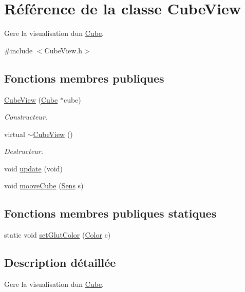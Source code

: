 \hypertarget{classCubeView}{}\section{Référence de la classe Cube\+View}
\label{classCubeView}


Gere la visualisation d\textquotesingle{}un \hyperlink{classCube}{Cube}.  




{\ttfamily \#include $<$Cube\+View.\+h$>$}

\subsection*{Fonctions membres publiques}
\begin{DoxyCompactItemize}
\item 
\hyperlink{classCubeView_af0ad3478ebbccf3e24470a36e6340056}{Cube\+View} (\hyperlink{classCube}{Cube} $\ast$cube)
\begin{DoxyCompactList}\small\item\em Constructeur. \end{DoxyCompactList}\item 
virtual \hyperlink{classCubeView_aabe4ec9d216a37a9806babf20821443d}{$\sim$\+Cube\+View} ()
\begin{DoxyCompactList}\small\item\em Destructeur. \end{DoxyCompactList}\item 
void \hyperlink{classCubeView_a100e58202c3413fd3b2f2ee8541cc1bf}{update} (void)
\item 
void \hyperlink{classCubeView_a372aebbea085bcb1b7068b4f9f075273}{moove\+Cube} (\hyperlink{CubeView_8h_a670da3ec6adfbba87f39752da3c76f15}{Sens} s)
\end{DoxyCompactItemize}
\subsection*{Fonctions membres publiques statiques}
\begin{DoxyCompactItemize}
\item 
static void \hyperlink{classCubeView_a6a3039eac5f892ce45308618f94a9a8b}{set\+Glut\+Color} (\hyperlink{CubeView_8h_ab87bacfdad76e61b9412d7124be44c1c}{Color} c)
\end{DoxyCompactItemize}


\subsection{Description détaillée}
Gere la visualisation d\textquotesingle{}un \hyperlink{classCube}{Cube}. 

